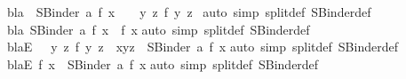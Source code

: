 \begin{isabellebody}
\endisatagproof
{\isafoldproof}%
%
\isadelimproof
\isanewline
%
\endisadelimproof
\isanewline
{}\isamarkupfalse%
\ bla{\isacharprime}\ {\isacharcolon}\ {\isachardoublequoteopen}{\isacharparenleft}SBinder\ a\ f{\isacharparenright}\ x\ {\isasymLongrightarrow}\ \ {\isacharparenleft}{\isasymexists}\ y\ z{\isachardot}\ f\ y\ z{\isacharparenright}{\isachardoublequoteclose}\ \isanewline
%
\isadelimproof
%
\endisadelimproof
%
\isatagproof
{}\isamarkupfalse%
{\isacharparenleft}auto\ simp{\isacharcolon}\ split{\isacharunderscore}def\ SBinder{\isacharunderscore}def{\isacharparenright}%
\endisatagproof
{\isafoldproof}%
%
\isadelimproof
\isanewline
%
\endisadelimproof
\isanewline
{}\isamarkupfalse%
\ bla{}{\isacharprime}{\isacharcolon}\ {\isachardoublequoteopen}{\isacharparenleft}SBinder{}\ a\ f{\isacharparenright}\ x\ {\isasymLongrightarrow}\ f\ x{\isachardoublequoteclose}\isanewline
%
\isadelimproof
%
\endisadelimproof
%
\isatagproof
{}\isamarkupfalse%
{\isacharparenleft}auto\ simp{\isacharcolon}\ split{\isacharunderscore}def\ SBinder{}{\isacharunderscore}def{\isacharparenright}%
\endisatagproof
{\isafoldproof}%
%
\isadelimproof
\isanewline
%
\endisadelimproof
\isanewline
{}\isamarkupfalse%
\ blaE\ {\isacharcolon}\ {\isachardoublequoteopen}{\isacharparenleft}{\isasymexists}\ y\ z{\isachardot}\ f\ y\ z\ {\isasymand}\ x{\isacharequal}{\isacharparenleft}y{\isacharcomma}z{\isacharparenright}{\isacharparenright}\ {\isasymLongrightarrow}\ {\isacharparenleft}SBinder\ a\ f{\isacharparenright}\ x{\isachardoublequoteclose}\isanewline
%
\isadelimproof
%
\endisadelimproof
%
\isatagproof
{}\isamarkupfalse%
{\isacharparenleft}auto\ simp{\isacharcolon}\ split{\isacharunderscore}def\ SBinder{\isacharunderscore}def{\isacharparenright}%
\endisatagproof
{\isafoldproof}%
%
\isadelimproof
\isanewline
%
\endisadelimproof
\isanewline
{}\isamarkupfalse%
\ bla{}E{\isacharcolon}\ {\isachardoublequoteopen}{\isacharparenleft}f\ x{\isacharparenright}\ {\isasymLongrightarrow}\ {\isacharparenleft}SBinder{}\ a\ f{\isacharparenright}\ x{\isachardoublequoteclose}\isanewline
%
\isadelimproof
%
\endisadelimproof
%
\isatagproof
{}\isamarkupfalse%
{\isacharparenleft}auto\ simp{\isacharcolon}\ split{\isacharunderscore}def\ SBinder{}{\isacharunderscore}def{\isacharparenright}%
\endisatagproof
{\isafoldproof}%
%
\isadelimproof
\isanewline
%
\endisadelimproof
\isanewline
\ \ \isanewline
{}\isamarkupfalse%

\end{isabellebody}

